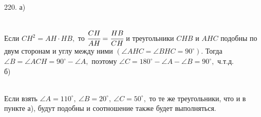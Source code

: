 220. а)\begin{figure}[ht!]
\end{figure}\\
Если $CH^2=AH\cdot HB,$ то $\cfrac{CH}{AH}=\cfrac{HB}{CH}$ и треугольники $CHB$ и $AHC$ подобны по двум сторонам и углу между ними $(\angle AHC=\angle BHC=90^\circ).$ Тогда $\angle B=\angle ACH=90^\circ-\angle A,$ поэтому $\angle C=180^\circ-\angle A-\angle B=90^\circ,$ ч.т.д.\\
б) \begin{figure}[ht!]
\end{figure}\\
Если взять $\angle A=110^\circ,\ \angle B=20^\circ,\ \angle C=50^\circ,$ то те же треугольники, что и в пункте а), будут подобны и соотношение также будет выполняться.\\
